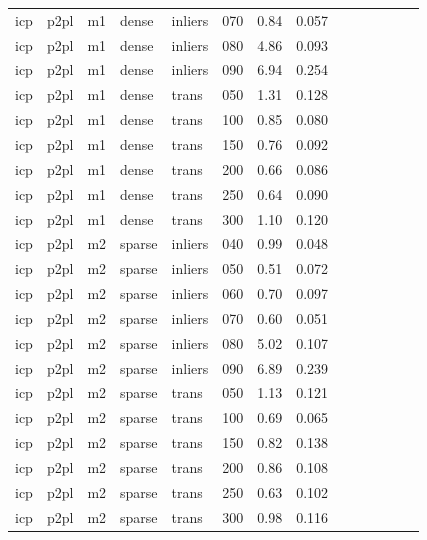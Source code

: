 \begin{table}[htbp]
\begin{tabular}{llllllrrrrrrrr}
  icp & p2pl & m1 & dense & inliers & 070 & 0.84 & 0.057 \\
  icp & p2pl & m1 & dense & inliers & 080 & 4.86 & 0.093 \\
  icp & p2pl & m1 & dense & inliers & 090 & 6.94 & 0.254 \\
  icp & p2pl & m1 & dense & trans & 050 & 1.31 & 0.128 \\
  icp & p2pl & m1 & dense & trans & 100 & 0.85 & 0.080 \\
  icp & p2pl & m1 & dense & trans & 150 & 0.76 & 0.092 \\
  icp & p2pl & m1 & dense & trans & 200 & 0.66 & 0.086 \\
  icp & p2pl & m1 & dense & trans & 250 & 0.64 & 0.090 \\
  icp & p2pl & m1 & dense & trans & 300 & 1.10 & 0.120 \\
  icp & p2pl & m2 & sparse & inliers & 040 & 0.99 & 0.048 \\
  icp & p2pl & m2 & sparse & inliers & 050 & 0.51 & 0.072 \\
  icp & p2pl & m2 & sparse & inliers & 060 & 0.70 & 0.097 \\
  icp & p2pl & m2 & sparse & inliers & 070 & 0.60 & 0.051 \\
  icp & p2pl & m2 & sparse & inliers & 080 & 5.02 & 0.107 \\
  icp & p2pl & m2 & sparse & inliers & 090 & 6.89 & 0.239 \\
  icp & p2pl & m2 & sparse & trans & 050 & 1.13 & 0.121 \\
  icp & p2pl & m2 & sparse & trans & 100 & 0.69 & 0.065 \\
  icp & p2pl & m2 & sparse & trans & 150 & 0.82 & 0.138 \\
  icp & p2pl & m2 & sparse & trans & 200 & 0.86 & 0.108 \\
  icp & p2pl & m2 & sparse & trans & 250 & 0.63 & 0.102 \\
  icp & p2pl & m2 & sparse & trans & 300 & 0.98 & 0.116 \\
\bottomrule
\end{tabular}
\end{table}
